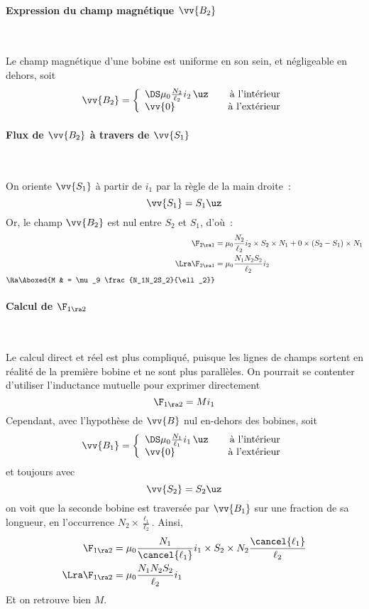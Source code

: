\documentclass[../main/main.tex]{subfiles}
\begin{document}
\paragraph*{Expression du champ magnétique $\vv{B_2}$}~
\begin{hide}
	Le champ magnétique d'une bobine est uniforme en son sein, et négligeable en
	dehors, soit
	\[
		\vv{B_2} =
		\left\{
		\begin{array}{lr}
			\DS
			\mu_0 \frac{N_2}{\ell_2}i_2\,\uz \quad & \text{à l'intérieur}
			\\
			\vv{0} \quad                           & \text{à l'extérieur}
		\end{array}
		\right.
	\]
\end{hide}

\paragraph*{Flux de $\vv{B_2}$ à travers de $\vv{S_1}$}~
\begin{hide}
	On oriente $\vv{S_1}$ à partir de $i_1$ par la règle de la main droite~:
	\[
		\vv{S_1} = S_1\uz
	\]
	Or, le champ $\vv{B_2}$ est nul entre $S_2$ et $S_1$, d'où~:
	\begin{align*}
		\F_{2\ra 1} & = \mu_0 \frac{N_2}{\ell_2}i_2 \times S_2\times N_1
		+ 0\times (S_2-S_1) \times N_1
		\\\Lra
		\F_{2\ra 1} & = \mu_0 \frac{N_1N_2S_2}{\ell_2} i_2
		\\\Ra
		\Aboxed{M   & = \mu_9 \frac{N_1N_2S_2}{\ell _2}}
	\end{align*}
\end{hide}

\paragraph*{Calcul de $\F_{1\ra 2}$}~
\begin{hide}
	Le calcul direct et réel est plus compliqué, puisque les lignes de champs
	sortent en réalité de la première bobine et ne sont plus parallèles. On
	pourrait se contenter d'utiliser l'inductance mutuelle pour exprimer
	directement
	\[
		\F_{1\ra 2} = Mi_1
	\]
	Cependant, avec l'hypothèse de $\vv{B}$ nul en-dehors des bobines, soit
	\[
		\vv{B_1} =
		\left\{
		\begin{array}{lr}
			\DS
			\mu_0 \frac{N_1}{\ell_1}i_1\,\uz \quad & \text{à l'intérieur}
			\\
			\vv{0} \quad                           & \text{à l'extérieur}
		\end{array}
		\right.
	\]
	et toujours avec
	\[
		\vv{S_2} = S_2\uz
	\]
	on voit que la seconde bobine est traversée par $\vv{B_1}$ sur une fraction de
	sa longueur, en l'occurrence $N_2\times \frac{\ell _1}{\ell _2}$. Ainsi,
	\begin{align*}
		\F_{1\ra 2} & = \mu_0 \frac{N_1}{\cancel{\ell _1}}i_1\times
		S_2 \times N_2\frac{\cancel{\ell _1}}{\ell _2}
		\\\Lra
		\F_{1\ra 2} & = \mu_0 \frac{N_1N_2S_2}{\ell _2}i_1
	\end{align*}
	Et on retrouve bien $M$.
\end{hide}
\end{document}
